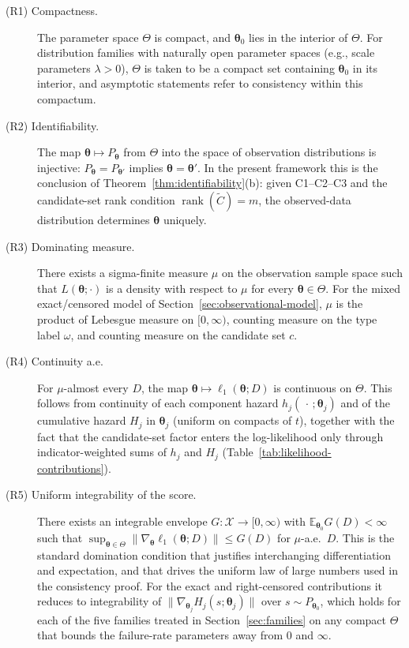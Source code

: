 \documentclass[11pt]{article}
\theoremstyle{definition}
\theoremstyle{plain}
\renewcommand{\v}[1]{\boldsymbol{#1}}
\newcommand{\E}{\mathbb{E}}
\begin{document}
\begin{description}
    \item[(R1) Compactness.] The parameter space $\Theta$ is compact,
    and $\v{\theta}_0$ lies in the interior of $\Theta$. For
    distribution families with naturally open parameter spaces (e.g.,
    scale parameters $\lambda > 0$), $\Theta$ is taken to be a compact
    set containing $\v{\theta}_0$ in its interior, and asymptotic
    statements refer to consistency within this compactum.

    \item[(R2) Identifiability.] The map
    $\v{\theta} \mapsto P_{\v{\theta}}$ from $\Theta$ into the space of
    observation distributions is injective:
    $P_{\v{\theta}} = P_{\v{\theta}'}$ implies
    $\v{\theta} = \v{\theta}'$. In the present framework this is the
    conclusion of Theorem~\ref{thm:identifiability}(b): given C1--C2--C3
    and the candidate-set rank condition $\operatorname{rank}(\tilde
    C) = m$, the observed-data distribution determines $\v{\theta}$
    uniquely.

    \item[(R3) Dominating measure.] There exists a sigma-finite
    measure $\mu$ on the observation sample space such that
    $L(\v{\theta}; \cdot)$ is a density with respect to $\mu$ for every
    $\v{\theta} \in \Theta$. For the mixed exact/censored model of
    Section~\ref{sec:observational-model}, $\mu$ is the product of
    Lebesgue measure on $[0, \infty)$, counting measure on the type
    label $\omega$, and counting measure on the candidate set $c$.

    \item[(R4) Continuity a.e.] For $\mu$-almost every $D$, the map
    $\v{\theta} \mapsto \ell_1(\v{\theta}; D)$ is continuous on
    $\Theta$. This follows from continuity of each component hazard
    $h_j(\,\cdot\,; \v{\theta}_j)$ and of the cumulative hazard
    $H_j$ in $\v{\theta}_j$ (uniform on compacts of $t$), together
    with the fact that the candidate-set factor enters the
    log-likelihood only through indicator-weighted sums of $h_j$ and
    $H_j$ (Table~\ref{tab:likelihood-contributions}).

    \item[(R5) Uniform integrability of the score.] There exists an
    integrable envelope $G : \mathcal{X} \to [0, \infty)$ with
    $\E_{\v{\theta}_0} G(D) < \infty$ such that
    $\sup_{\v{\theta} \in \Theta} \|\nabla_{\v{\theta}} \ell_1(\v{\theta};
    D)\| \le G(D)$ for $\mu$-a.e.~$D$. This is the standard
    domination condition that justifies interchanging differentiation
    and expectation, and that drives the uniform law of large numbers
    used in the consistency proof. For the exact and right-censored
    contributions it reduces to integrability of
    $\|\nabla_{\v{\theta}_j} H_j(s; \v{\theta}_j)\|$ over $s \sim
    P_{\v{\theta}_0}$, which holds for each of the five families
    treated in Section~\ref{sec:families} on any compact $\Theta$ that
    bounds the failure-rate parameters away from $0$ and $\infty$.


\end{description}
\end{document}
